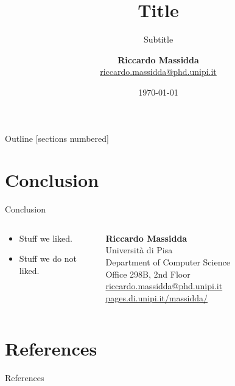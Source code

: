 \documentclass[8pt,xcolor=svgnames, compress]{beamer}
\title{Title}
\author[Name]{
  {\large \textbf{Riccardo Massidda}}\\
  \href{mailto:riccardo.massidda@phd.unipi.it}{\textcolor{main}{riccardo.massidda@phd.unipi.it}}\\
}
\subtitle{Subtitle}
\institute[uni]{\large Department of Computer Science\\University of Pisa}
\date{\today}
\begin{document}
{
\maketitle
}



\begin{frame}{Outline}
  [sections numbered] 
  \tableofcontents[hideallsubsections]
\end{frame}





\section*{Conclusion}

\begin{frame}{Conclusion}
  \centering
  \begin{columns}
    \begin{column}{0.6\textwidth}
      \begin{itemize}
        \item Stuff we liked.
        \item Stuff we do not liked.
      \end{itemize}
    \end{column}
    \begin{column}{0.4\textwidth}
      \pause\textbf{Riccardo Massidda}\\
      {Università di Pisa}\\
      {Department of Computer Science}\\
      {Office 298B, 2nd Floor}\\[1em]
      \href{mailto:riccardo.massidda@phd.unipi.it}{riccardo.massidda@phd.unipi.it}
      \href{https://pages.di.unipi.it/massidda/}{pages.di.unipi.it/massidda/}
    \end{column}
  \end{columns}
\end{frame}

\section*{References}

\begin{frame}[plain]{References}
    \printbibliography[heading=none]
\end{frame}
\end{document}
